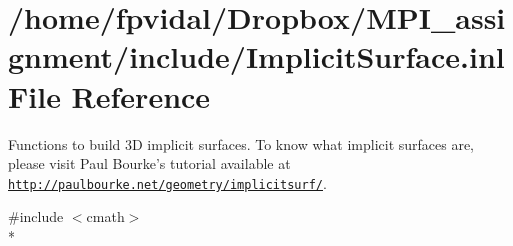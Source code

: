 \hypertarget{_implicit_surface_8inl}{\section{/home/fpvidal/\-Dropbox/\-M\-P\-I\-\_\-assignment/include/\-Implicit\-Surface.inl File Reference}
\label{_implicit_surface_8inl}
}


Functions to build 3\-D implicit surfaces. To know what implicit surfaces are, please visit Paul Bourke's tutorial available at \href{http://paulbourke.net/geometry/implicitsurf/}{\tt http\-://paulbourke.\-net/geometry/implicitsurf/}.  


{\ttfamily \#include $<$cmath$>$}\\*
